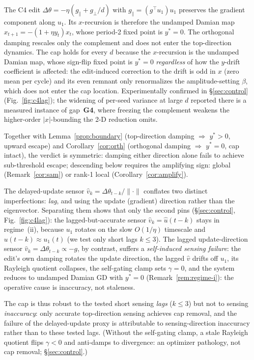 \begin{corollary}
\label{cor:orth}
The C4 edit $\Delta\theta=-\eta(g_{\parallel}+g_{\perp}/d)$ with
$g_{\parallel}=(g^{\top}u_{1})u_{1}$ preserves the gradient component along
$u_{1}$. Its $x$-recursion is therefore the undamped Damian map
$x_{t+1}=-(1+\eta y_{t})x_{t}$, whose period-2 fixed point is $y^{*}=0$. The
orthogonal damping rescales only the complement and does not enter the
top-direction dynamics. The cap holds for every $d$ because the $x$-recursion is the undamped Damian
map, whose sign-flip fixed point is $y^{*}=0$ \emph{regardless} of how the
$y$-drift coefficient is affected: the edit-induced correction to the drift is
odd in $x$ (zero mean per cycle) and its even remnant only renormalizes the
amplitude-setting $\beta$, which does not enter the cap location.
Experimentally confirmed in \S\ref{sec:control}
(Fig.~\ref{fig:c4lag}); the widening of per-seed variance at large $d$
reported there is a measured instance of gap~\textbf{G4}, where freezing the
complement weakens the higher-order $|x|$-bounding the 2-D reduction omits.
\end{corollary}

Together with Lemma~\ref{prop:boundary} (top-direction
damping $\Rightarrow$ $y^{*}>0$, upward escape) and Corollary~\ref{cor:orth}
(orthogonal damping $\Rightarrow$ $y^{*}=0$, cap intact), the verdict is
symmetric: damping either direction alone fails to achieve sub-threshold escape; descending
below requires the amplifying sign: global (Remark~\ref{cor:sam}) or
rank-1 local (Corollary~\ref{cor:amplify}).

\begin{observation}
\label{obs:lagged}
The delayed-update sensor $\hat v_{k}=\Delta\theta_{t-k}/\|\cdot\|$ conflates
two distinct imperfections: \emph{lag}, and using the update (gradient)
direction rather than the eigenvector. Separating them shows that only the
second pins (\S\ref{sec:control}, Fig.~\ref{fig:c4lag}): the lagged-but-accurate
sensor $\hat v_{k}=\hat u(t{-}k)$ stays in regime~(ii), because $u_{1}$
rotates on the slow $O(1/\eta)$ timescale \citep{damian2023selfstab} and
$\hat u(t{-}k)\approx u_{1}(t)$ (we test only short lags $k\le3$). The lagged
update-direction sensor $\hat v_{k}=\Delta\theta_{t-k}\propto-g$, by contrast,
suffers a \emph{self-induced sensing failure}: the edit's own damping rotates
the update direction, the lagged $\hat v$ drifts off $u_{1}$, its Rayleigh
quotient collapses, the self-gating clamp sets $\gamma{=}0$, and the system
reduces to undamped Damian GD with $y^{*}=0$ (Remark~\ref{rem:regime-i}): the
operative cause is inaccuracy, not staleness.
\end{observation}
The cap is thus robust to the tested short sensing \emph{lags}
($k\le3$) but not to sensing \emph{inaccuracy}: only accurate top-direction
sensing achieves cap removal, and the failure of the delayed-update proxy is
attributable to sensing-direction inaccuracy rather than to these tested
lags.
(Without the self-gating clamp, a stale Rayleigh quotient flips $\gamma<0$ and
anti-damps to divergence: an optimizer pathology, not cap removal;
\S\ref{sec:control}.)
